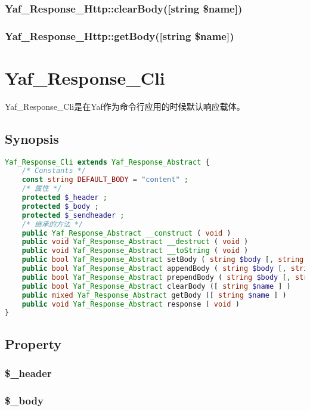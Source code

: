 \subsection{Yaf\_Response\_Http::clearBody([string \$name])}
\subsection{Yaf\_Response\_Http::getBody([string \$name])}

\chapter{Yaf\_Response\_Cli}

Yaf\_Response\_Cli是在Yaf作为命令行应用的时候默认响应载体。

\section{Synopsis}



\begin{lstlisting}[language=PHP]
Yaf_Response_Cli extends Yaf_Response_Abstract {
    /* Constants */
    const string DEFAULT_BODY = "content" ;
    /* 属性 */
    protected $_header ;
    protected $_body ;
    protected $_sendheader ;
    /* 继承的方法 */
    public Yaf_Response_Abstract __construct ( void )
    public void Yaf_Response_Abstract __destruct ( void )
    public void Yaf_Response_Abstract __toString ( void )
    public bool Yaf_Response_Abstract setBody ( string $body [, string $name ] )
    public bool Yaf_Response_Abstract appendBody ( string $body [, string $name ] )
    public bool Yaf_Response_Abstract prependBody ( string $body [, string $name ] )
    public bool Yaf_Response_Abstract clearBody ([ string $name ] )
    public mixed Yaf_Response_Abstract getBody ([ string $name ] )
    public void Yaf_Response_Abstract response ( void )
}
\end{lstlisting}


\section{Property}

\subsection{\$\_header}


\subsection{\$\_body}


